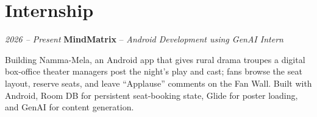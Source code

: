     \section{Internship}
        \begin{twocolentry}{
        \textit{2026 -- Present}}
            \textbf{MindMatrix} --
            \textit{Android Development using GenAI Intern}
        \end{twocolentry}
        \vspace{0.10 cm}
        \begin{onecolentry}
            \begin{highlights}
                \item Building Namma-Mela, an Android app that gives rural drama troupes a digital box-office theater managers post the night's play and cast; fans browse the seat layout, reserve seats, and leave ``Applause'' comments on the Fan Wall. Built with Android, Room DB for persistent seat-booking state, Glide for poster loading, and GenAI for content generation.
            \end{highlights}
        \end{onecolentry}
        \vspace{0.2 cm}
